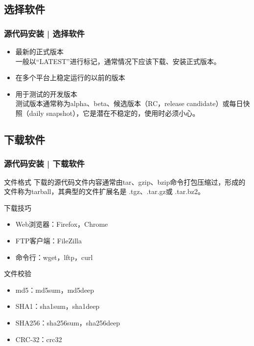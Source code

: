 \subsection{选择软件}
\begin{frame}
  \frametitle{源代码安装 | 选择软件}
  \begin{itemize}
    \item 最新的正式版本\\
      一般以“LATEST”进行标记，通常情况下应该下载、安装正式版本。
    \item 在多个平台上稳定运行的以前的版本
    \item 用于测试的开发版本\\
      测试版本通常称为alpha、beta、候选版本（RC，release candidate）或每日快照（daily snapshot），它是潜在不稳定的，使用时必须小心。
  \end{itemize}
\end{frame}

\subsection{下载软件}
\begin{frame}
  \frametitle{源代码安装 | 下载软件}
  \begin{block}{文件格式}
    下载的源代码文件内容通常由tar、gzip、bzip命令打包压缩过，形成的文件称为tarball，其典型的文件扩展名是 .tgz、.tar.gz或 .tar.bz2。
  \end{block}
  \pause
  \begin{block}{下载技巧}
    \begin{itemize}
      \item Web浏览器：Firefox，Chrome
      \item FTP客户端：FileZilla
      \item 命令行：wget，lftp，curl
    \end{itemize}
  \end{block}
  \pause
  \begin{block}{文件校验}
    \begin{itemize}
      \item md5：md5sum，md5deep
      \item SHA1：sha1sum，sha1deep
      \item SHA256：sha256sum，sha256deep
      \item CRC-32：crc32
    \end{itemize}
  \end{block}
\end{frame}

